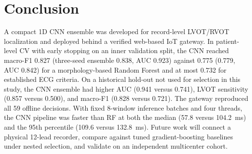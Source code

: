 \documentclass[conference,a4paper]{IEEEtran}
\begin{document}
\section{Conclusion}
A compact 1D CNN ensemble was developed for record-level LVOT/RVOT localization and deployed behind a verified web-based IoT gateway. In patient-level CV with early stopping on an inner validation split, the CNN reached macro-F1 0.827 (three-seed ensemble 0.838, AUC 0.923) against 0.775 (0.779, AUC 0.842) for a morphology-based Random Forest and at most 0.732 for established ECG criteria. On a historical hold-out not used for selection in this study, the CNN ensemble had higher AUC (0.941 versus 0.741), LVOT sensitivity (0.857 versus 0.500), and macro-F1 (0.828 versus 0.721). The gateway reproduced all 59 offline decisions. With fixed 8-window inference batches and four threads, the CNN pipeline was faster than RF at both the median (57.8 versus 104.2~ms) and the 95th percentile (109.6 versus 132.8~ms). Future work will connect a physical 12-lead recorder, compare against tuned gradient-boosting baselines under nested selection, and validate on an independent multicenter cohort.
\end{document}

